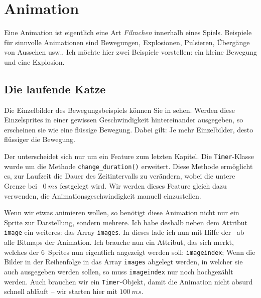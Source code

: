 \newpage
\section{Animation}
Eine Animation ist eigentlich eine Art \emph{Filmchen} innerhalb eines Spiels. Beispiele für sinnvolle Animationen sind Bewegungen, Explosionen, Pulsieren, Übergänge von Aussehen usw.. Ich möchte hier zwei Beispiele vorstellen: ein kleine Bewegung und eine Explosion.

\subsection{Die laufende Katze}


Die Einzelbilder des Bewegungsbeispiels können Sie in  sehen. Werden diese Einzelsprites in einer gewissen Geschwindigkeit hintereinander ausgegeben, so erscheinen sie wie eine flüssige Bewegung. Dabei gilt: Je mehr Einzelbilder, desto flüssiger die Bewegung.

Der  unterscheidet sich nur um ein Feature zum letzten Kapitel. Die \texttt{Timer}-Klasse wurde um die Methode \texttt{change\_duration()} erweitert. Diese Methode ermöglicht es, zur Laufzeit die Dauer des Zeitintervalls zu verändern, wobei die untere Grenze bei ~$0~ms$ festgelegt wird. Wir werden dieses Feature gleich dazu verwenden, die Animationsgeschwindigkeit manuell einzustellen. 


Wenn wir etwas animieren wollen, so benötigt diese Animation nicht nur ein Sprite zur Darstellung, sondern mehrere. Ich habe deshalb neben dem Attribut \texttt{image} ein weiteres: das Array \texttt{images}. In dieses lade ich nun mit Hilfe der \forSchleife\ ab  alle Bitmaps der Animation. Ich brauche nun ein Attribut, das sich merkt, welches der 6~Sprites nun eigentlich angezeigt werden soll: \texttt{imageindex}; Wenn die Bilder in der Reihenfolge in das Array \texttt{images} abgelegt werden, in welcher sie auch ausgegeben werden sollen, so muss \texttt{imageindex} nur noch hochgezählt werden. Auch brauchen wir ein \texttt{Timer}-Objekt, damit die Animation nicht absurd schnell abläuft -- wir starten hier mit $100~ms$.

